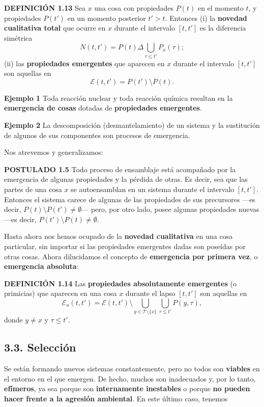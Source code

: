 {\fontsize{13}{15}\selectfont
\textbf{DEFINICIÓN 1.13} Sea $x$ una cosa con propiedades $P(t)$ en el momento $t$, y propiedades $P(t')$ en un momento posterior $t' > t$. Entonces
(i) la \textbf{novedad cualitativa total} que ocurre en $x$ durante el intervalo $[t, t']$ es la diferencia simétrica
$$ N(t, t') = P(t) \Delta \bigcup_{\tau \le t'} P_x(\tau); $$
(ii) las \textbf{propiedades emergentes} que aparecen en $x$ durante el intervalo $[t, t']$ son aquellas en
$$ \mathcal{E}(t, t') = P(t') \setminus P(t). $$

\textbf{Ejemplo 1} Toda reacción nuclear y toda reacción química resultan en la \textbf{emergencia de cosas} dotadas de \textbf{propiedades emergentes}.

\textbf{Ejemplo 2} La descomposición (desmantelamiento) de un sistema y la sustitución de algunos de sus componentes son procesos de emergencia.

Nos atrevemos y generalizamos:

\textbf{POSTULADO 1.5} Todo proceso de ensamblaje está acompañado por la emergencia de algunas propiedades y la pérdida de otras. Es decir, sea que las partes de una cosa $x$ se autoensamblan en un sistema durante el intervalo $[t, t']$. Entonces el sistema carece de algunas de las propiedades de sus precursores —es decir, $P(t) \setminus P(t') \neq \emptyset$— pero, por otro lado, posee algunas propiedades nuevas —es decir, $P(t') \setminus P(t) \neq \emptyset$.

Hasta ahora nos hemos ocupado de la \textbf{novedad cualitativa} en una cosa particular, sin importar si las propiedades emergentes dadas son poseídas por otras cosas. Ahora dilucidamos el concepto de \textbf{emergencia por primera vez}, o \textbf{emergencia absoluta}:

\textbf{DEFINICIÓN 1.14} Las \textbf{propiedades absolutamente emergentes} (o primicias) que aparecen en una cosa $x$ durante el lapso $[t, t']$ son aquellas en
$$ \mathcal{E}_a(t, t') = \mathcal{E}(t, t') \setminus \bigcup_{y \in \mathcal{T} \setminus \{x\}} \bigcup_{\tau \le t'} P(y, \tau), $$
donde $y \neq x$ y $\tau \le t'$.

\subsection*{3.3. Selección}
Se están formando nuevos sistemas constantemente, pero no todos son \textbf{viables} en el entorno en el que emergen. De hecho, muchos son inadecuados y, por lo tanto, \textbf{efímeros}, ya sea porque son \textbf{internamente inestables} o porque \textbf{no pueden hacer frente a la agresión ambiental}. En este último caso, tenemos
}
